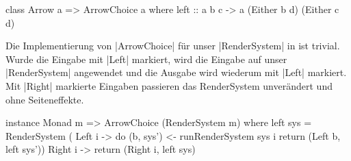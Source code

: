 
\begin{haskell}[label={lst:class-arrowchoice},caption={ArrowChoice Klasse\protect\footnotemark},nolol]
class Arrow a => ArrowChoice a where
  left :: a b c -> a (Either b d) (Either c d)
\end{haskell}

Die Implementierung von |ArrowChoice| für unser |RenderSystem| in  ist trivial. Wurde die Eingabe mit |Left| markiert, wird die Eingabe auf unser |RenderSystem| angewendet und die Ausgabe wird wiederum mit |Left| markiert. Mit |Right| markierte Eingaben passieren das RenderSystem unverändert und ohne Seiteneffekte.

\begin{haskell}[label={lst:rendersystem-arrowchoice},caption={ArrowChoice Instanz für RenderSystem}]
instance Monad m => ArrowChoice (RenderSystem m) where
  left sys = RenderSystem (\case
    Left i  -> do
      (b, sys') <- runRenderSystem sys i
      return (Left b, left sys'))
    Right i -> return (Right i, left sys)
\end{haskell}
